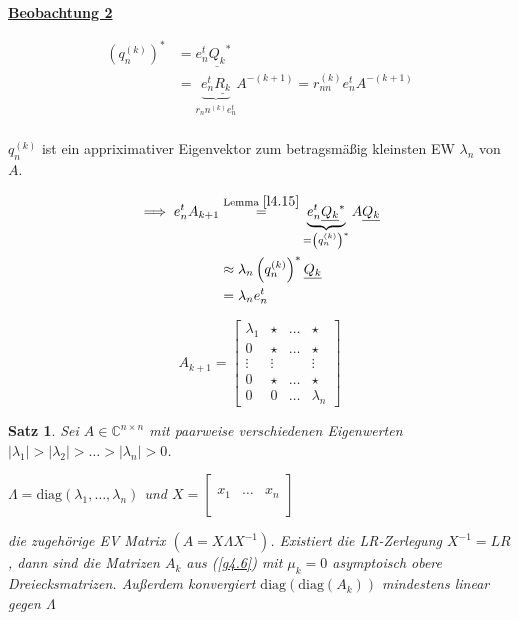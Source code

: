 \documentclass{book}
\newtheorem{theorem}[algorithm]{Satz}
\def\C{\mathbb{C}}
\begin{document}
            \underline{\textbf{Beobachtung 2}}

            \begin{align*}
                \left(q_n^{(k)}\right)^*&=e_n^t \underline{Q_k}^*\\
                &=\underbrace{e^t_n\underline{R_k}}_{r_nn^{(k)}e_n^t}A^{-(k+1)}=r_{nn}^{(k)}e_n^t A^{-(k+1)}\\
            \end{align*}

            $q_n^{(k)}$ ist ein appriximativer Eigenvektor zum betragsmäßig kleinsten EW $\lambda_n$ von $A$.

            \begin{align*}
                \implies e_n^t A_{k+1}&\stackrel{\text{Lemma }\ref{l4.15}}{=}\underbrace{e_n^t\underline{Q_k}^*}_{= \left(q_n^{(k)}\right)^*}A\underline{Q_k}\\
                &\approx \lambda_n  \left(q_n^{(k)}\right)^* \underline{Q_k}\\
                &=\lambda_n e_n^t\\
            \end{align*}

            \begin{equation*}
                A_{k+1}=
                    \begin{bmatrix}
                        \lambda_1 & \star & \dots & \star\\
                        0& \star & \dots & \star\\
                        \vdots & \vdots &&\vdots \\
                        0 &  \star& \dots & \star\\
                        0 & 0& \dots & \lambda_n
                    \end{bmatrix}
            \end{equation*}

            \begin{theorem}\label{s4.17}
                Sei $A\in\C^{n\times n}$ mit paarweise verschiedenen Eigenwerten $\left\vert \lambda_1 \right\vert>\left\vert \lambda_2 \right\vert>\dots >\left\vert \lambda_n \right\vert>0$.
                
                $\Lambda=\text{diag}(\lambda_1,\dots,\lambda_n)$ und $X=\begin{bmatrix}
                    &&\\
                    x_1 & \dots & x_n\\
                    &&\\
                \end{bmatrix}$

                die zugehörige EV Matrix $(A=X \Lambda X^{-1})$. Existiert die LR-Zerlegung $X^{-1}=LR$, dann sind die Matrizen
                $A_k$ aus (\ref{g4.6}) mit $\mu_k=0$ asymptoisch obere Dreiecksmatrizen. Außerdem konvergiert $\text{diag}(\text{diag}(A_k))$ mindestens linear gegen $\Lambda$

            \end{theorem}
\end{document}
